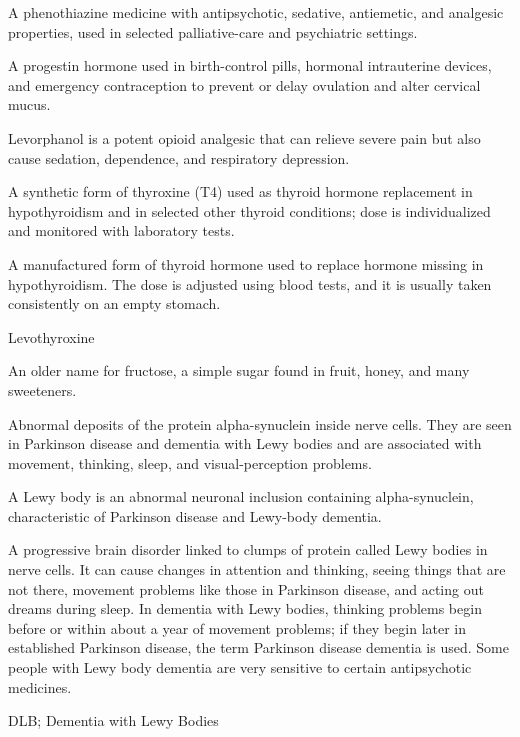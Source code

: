  A phenothiazine medicine with antipsychotic, sedative, antiemetic, and analgesic properties, used in selected palliative-care and psychiatric settings.

 A progestin hormone used in birth-control pills, hormonal intrauterine devices, and emergency contraception to prevent or delay ovulation and alter cervical mucus.

 Levorphanol is a potent opioid analgesic that can relieve severe pain but also cause sedation, dependence, and respiratory depression.

 A synthetic form of thyroxine (T4) used as thyroid hormone replacement in hypothyroidism and in selected other thyroid conditions; dose is individualized and monitored with laboratory tests.

 A manufactured form of thyroid hormone used to replace hormone missing in hypothyroidism. The dose is adjusted using blood tests, and it is usually taken consistently on an empty stomach.

\synonyms
Levothyroxine

 An older name for fructose, a simple sugar found in fruit, honey, and many sweeteners.

 Abnormal deposits of the protein alpha-synuclein inside nerve cells. They are seen in Parkinson disease and dementia with Lewy bodies and are associated with movement, thinking, sleep, and visual-perception problems.

 A Lewy body is an abnormal neuronal inclusion containing alpha-synuclein, characteristic of Parkinson disease and Lewy-body dementia.

 A progressive brain disorder linked to clumps of protein called Lewy bodies in nerve cells. It can cause changes in attention and thinking, seeing things that are not there, movement problems like those in Parkinson disease, and acting out dreams during sleep. In dementia with Lewy bodies, thinking problems begin before or within about a year of movement problems; if they begin later in established Parkinson disease, the term Parkinson disease dementia is used. Some people with Lewy body dementia are very sensitive to certain antipsychotic medicines.

\synonyms
DLB; Dementia with Lewy Bodies

